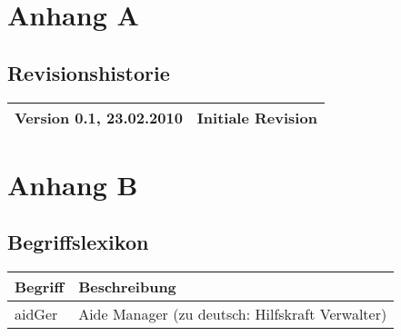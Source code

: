\documentclass[oneside,german,oneside]{scrbook}
\begin{document}
\pagebreak
\section{Anhang A}\label{sec:AnhangA}
  \subsection{Revisionshistorie}\label{sec:Revisionshistorie}

    \begin{tabular}{|b|l|}
    \hline
    Version 0.1, 23.02.2010 & Initiale Revision \\
    \hline
    \end{tabular}

\section{Anhang B}\label{sec:AnhangB}
  \subsection{Begriffslexikon}\label{sec:Begriffslexikon}

    \begin{tabular}{|b|l|}
    \hline
    Begriff & Beschreibung \\
    \hline
    aidGer & Aide Manager (zu deutsch: Hilfskraft Verwalter)
    \hline
    \end{tabular}    
\end{document}
